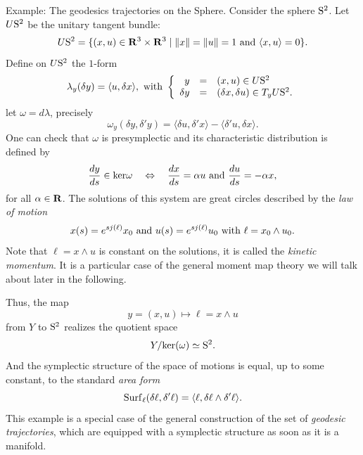 \begin{Article}{Example: The geodesics trajectories on the Sphere.}{}
  Consider the sphere $\mathrm{S}^2$.
  Let $U{\mathrm{S}^2}$ be the unitary tangent bundle:
  $$%
    \UnitBundle{\Sph^2} = \{ (x,u) \in \RR^3 \times \RR^3 \mid \Norm{x} = \Norm{u} = 1 \text{ and } \langle x, u \rangle =0 \}.
    $$%
  Define on $U{\mathrm{S}^2}$ the $1$-form
  $$%
    \lambda_y(\delta y) = \langle u, \delta x \rangle,
    \SpacedText{with}
    \left\{
    \begin{array}{rcl}
    y & = & (x,u) \in \UnitBundle{\Sph^2} \\
    \delta y & = & (\delta x, \delta u) \in T_y\UnitBundle{\Sph^2}.
    \end{array}
    \right.
    $$%
  let $\omega = d\lambda$,
  precisely
  $$%
    \omega_y(\delta y,\delta'y) = \langle \delta u, \delta' x \rangle - \langle \delta' u, \delta x \rangle.
    $$%
  One can check that $\omega$ is presymplectic and its characteristic distribution is defined by
  $$%
    {dy \over ds} \in \ker \omega
    \quad \Leftrightarrow \quad
    {dx \over ds} = \alpha u
    \SpacedText{and}
    {du \over ds} = - \alpha x,
    $$%
  for all $\alpha \in \mathbf{R}$.
  The solutions of this system are great circles described by the \emph{law of motion}
  $$%
    x(s) = e^{sj(\ell)}x_0
    \SpacedText{and}
    u(s) = e^{sj(\ell)}u_0
    \SpacedText{with}
    \ell = x_0 \wedge u_0.
    $$%
  Note that $\ell = x \wedge u$ is constant on the solutions,
  it is called the \emph{kinetic momentum}.
  It is a particular case of the general moment map theory we will talk about later in the following.
  
  Thus,
  the map
  $$%
    y = (x,u) \mapsto \ell = x \wedge u
    $$%
  from $Y$ to $\mathrm{S}^2$ realizes the quotient space
  $$%
    Y / \ker(\omega) \simeq \Sph^2.
    $$%
  And the symplectic structure of the space of motions is equal,
  up to some constant,
  to the standard \emph{area form}
  $$%
    \Surf_\ell(\delta \ell, \delta' \ell) = \langle \ell,\delta \ell \wedge \delta' \ell \rangle.
    $$%
  This example is a special case of the general construction of the set of \emph{geodesic trajectories},
  which are equipped with a symplectic structure as soon as it is a manifold.
\end{Article}

